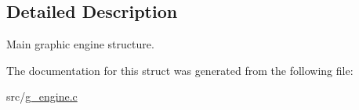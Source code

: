 \subsection{Detailed Description}
Main graphic engine structure. 

The documentation for this struct was generated from the following file\+:\begin{DoxyCompactItemize}
\item 
src/\hyperlink{g__engine_8c}{g\+\_\+engine.\+c}\end{DoxyCompactItemize}
